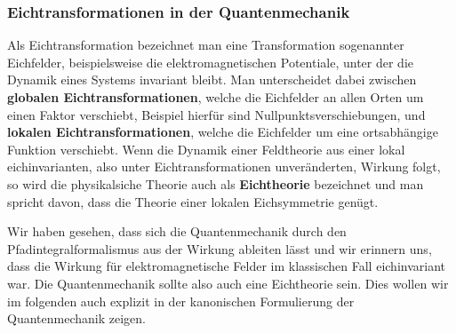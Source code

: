 \subsubsection{Eichtransformationen in der Quantenmechanik}

Als Eichtransformation bezeichnet man eine Transformation sogenannter Eichfelder, beispielsweise die elektromagnetischen Potentiale, unter der die Dynamik eines Systems invariant bleibt. Man unterscheidet dabei zwischen {\bf globalen Eichtransformationen}, welche die Eichfelder an allen Orten um einen Faktor verschiebt, Beispiel hierfür sind Nullpunktsverschiebungen, und {\bf lokalen Eichtransformationen}, welche die Eichfelder um eine ortsabhängige Funktion verschiebt. Wenn die Dynamik einer Feldtheorie aus einer lokal eichinvarianten, also unter Eichtransformationen unveränderten, Wirkung folgt, so wird die physikalsiche Theorie auch als {\bf Eichtheorie} bezeichnet und man spricht davon, dass die Theorie einer lokalen Eichsymmetrie genügt. 

Wir haben gesehen, dass sich die Quantenmechanik durch den Pfadintegralformalismus aus der Wirkung ableiten lässt und wir erinnern uns, dass die Wirkung für elektromagnetische Felder im klassischen Fall eichinvariant war. Die Quantenmechanik sollte also auch eine Eichtheorie sein. Dies wollen wir im folgenden auch explizit in der kanonischen Formulierung der Quantenmechanik zeigen. 

